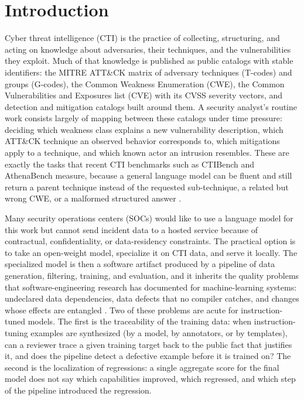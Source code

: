 \documentclass[twocolumn]{svjour3}
\begin{document}
\section{Introduction}\label{sec:intro}
Cyber threat intelligence (CTI) is the practice of collecting, structuring, and acting on knowledge about adversaries, their techniques, and the vulnerabilities they exploit. Much of that knowledge is published as public catalogs with stable identifiers: the MITRE ATT\&CK matrix of adversary techniques (T-codes) and groups (G-codes), the Common Weakness Enumeration (CWE), the Common Vulnerabilities and Exposures list (CVE) with its CVSS severity vectors, and detection and mitigation catalogs built around them. A security analyst's routine work consists largely of mapping between these catalogs under time pressure: deciding which weakness class explains a new vulnerability description, which ATT\&CK technique an observed behavior corresponds to, which mitigations apply to a technique, and which known actor an intrusion resembles. These are exactly the tasks that recent CTI benchmarks such as CTIBench and AthenaBench measure, because a general language model can be fluent and still return a parent technique instead of the requested sub-technique, a related but wrong CWE, or a malformed structured answer \cite{alam2024ctibench,alam2025athenabench}.

Many security operations centers (SOCs) would like to use a language model for this work but cannot send incident data to a hosted service because of contractual, confidentiality, or data-residency constraints. The practical option is to take an open-weight model, specialize it on CTI data, and serve it locally. The specialized model is then a software artifact produced by a pipeline of data generation, filtering, training, and evaluation, and it inherits the quality problems that software-engineering research has documented for machine-learning systems: undeclared data dependencies, data defects that no compiler catches, and changes whose effects are entangled \cite{sculley2015hidden,amershi2019se4ml,martinez2022se4ai}. Two of these problems are acute for instruction-tuned models. The first is the traceability of the training data: when instruction-tuning examples are synthesized (by a model, by annotators, or by templates), can a reviewer trace a given training target back to the public fact that justifies it, and does the pipeline detect a defective example before it is trained on? The second is the localization of regressions: a single aggregate score for the final model does not say which capabilities improved, which regressed, and which step of the pipeline introduced the regression.
\end{document}
